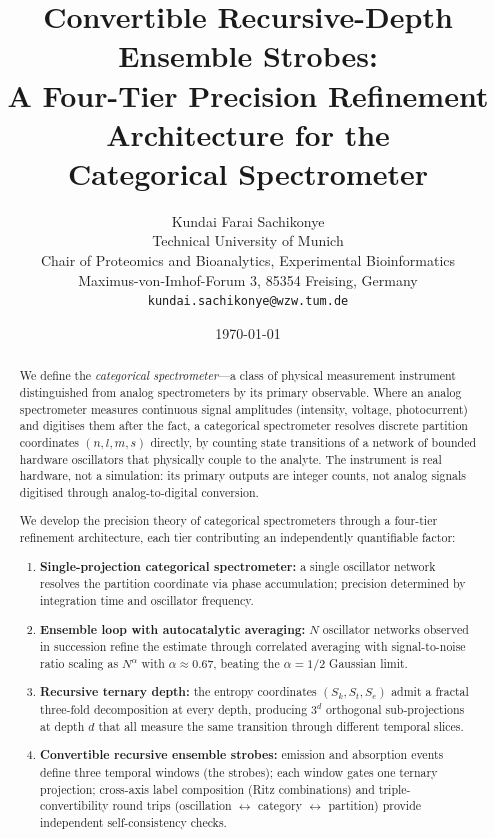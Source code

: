 \documentclass[11pt,a4paper]{article}
\title{\Large\textbf{Convertible Recursive-Depth Ensemble Strobes:\\
A Four-Tier Precision Refinement Architecture for the \\
Categorical Spectrometer}}
\author{Kundai Farai Sachikonye\\[2pt]
\small Technical University of Munich \\
\small Chair of Proteomics and Bioanalytics, Experimental Bioinformatics\\
\small Maximus-von-Imhof-Forum 3, 85354 Freising, Germany\\
\small \texttt{kundai.sachikonye@wzw.tum.de}}
\date{\today}
\theoremstyle{thmstyle}
\theoremstyle{axiomstyle}
\theoremstyle{definition}
\theoremstyle{remark}
\newcommand{\Sk}{S_{k}}
\newcommand{\St}{S_{t}}
\newcommand{\Se}{S_{e}}
\begin{document}
\maketitle

\begin{abstract}
\noindent
We define the \emph{categorical spectrometer}---a class of physical measurement instrument distinguished from analog spectrometers by its primary observable. Where an analog spectrometer measures continuous signal amplitudes (intensity, voltage, photocurrent) and digitises them after the fact, a categorical spectrometer resolves discrete partition coordinates $(n,l,m,s)$ directly, by counting state transitions of a network of bounded hardware oscillators that physically couple to the analyte. The instrument is real hardware, not a simulation: its primary outputs are integer counts, not analog signals digitised through analog-to-digital conversion.

We develop the precision theory of categorical spectrometers through a four-tier refinement architecture, each tier contributing an independently quantifiable factor:
\begin{enumerate}[label=(\textbf{T\arabic*})]
\item \textbf{Single-projection categorical spectrometer:} a single oscillator network resolves the partition coordinate via phase accumulation; precision determined by integration time and oscillator frequency.
\item \textbf{Ensemble loop with autocatalytic averaging:} $N$ oscillator networks observed in succession refine the estimate through correlated averaging with signal-to-noise ratio scaling as $N^{\alpha}$ with $\alpha\approx 0.67$, beating the $\alpha=1/2$ Gaussian limit.
\item \textbf{Recursive ternary depth:} the entropy coordinates $(\Sk, \St, \Se)$ admit a fractal three-fold decomposition at every depth, producing $3^{d}$ orthogonal sub-projections at depth $d$ that all measure the same transition through different temporal slices.
\item \textbf{Convertible recursive ensemble strobes:} emission and absorption events define three temporal windows (the strobes); each window gates one ternary projection; cross-axis label composition (Ritz combinations) and triple-convertibility round trips (oscillation $\leftrightarrow$ category $\leftrightarrow$ partition) provide independent self-consistency checks.
\end{enumerate}


\end{abstract}
\end{document}
